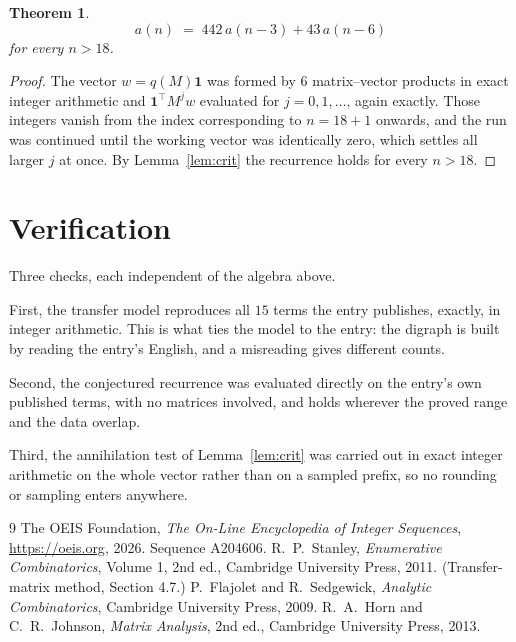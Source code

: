 \documentclass[11pt,a4paper]{article}
\theoremstyle{plain}
\newtheorem{theorem}{Theorem}
\theoremstyle{definition}
\begin{document}
\begin{theorem}
\[
a(n)\;=\;442\,a(n-3) + 43\,a(n-6)
\]
for every $n>18$.
\end{theorem}

\begin{proof}
The vector $w=q(M)\mathbf{1}$ was formed by $6$ matrix--vector products in exact
integer arithmetic and $\mathbf{1}^{\!\top}M^{j}w$ evaluated for $j=0,1,\dots$, again
exactly. Those integers vanish from the index corresponding to $n=18+1$ onwards, and the
run was continued until the working vector was identically zero, which settles all larger $j$
at once. By Lemma~\ref{lem:crit} the recurrence holds for every $n>18$.
\end{proof}

\section{Verification}

Three checks, each independent of the algebra above.

First, the transfer model reproduces all $15$ terms the entry publishes, exactly, in
integer arithmetic. This is what ties the model to the entry: the digraph is built by reading
the entry's English, and a misreading gives different counts.

Second, the conjectured recurrence was evaluated directly on the entry's own published terms,
with no matrices involved, and holds wherever the proved range and the data overlap.

Third, the annihilation test of Lemma~\ref{lem:crit} was carried out in exact integer
arithmetic on the whole vector rather than on a sampled prefix, so no rounding or sampling
enters anywhere.

\begin{thebibliography}{9}
 The OEIS Foundation, \emph{The On-Line Encyclopedia of Integer
Sequences}, \url{https://oeis.org}, 2026. Sequence A204606.
 R.~P.~Stanley, \emph{Enumerative Combinatorics}, Volume 1, 2nd ed.,
Cambridge University Press, 2011. (Transfer-matrix method, Section 4.7.)
 P.~Flajolet and R.~Sedgewick, \emph{Analytic Combinatorics}, Cambridge
University Press, 2009.
 R.~A.~Horn and C.~R.~Johnson, \emph{Matrix Analysis}, 2nd ed., Cambridge
University Press, 2013.
\end{thebibliography}
\end{document}

